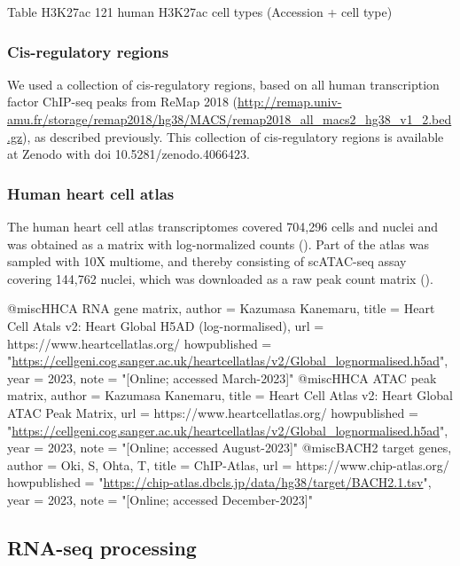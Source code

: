 Table H3K27ac
121 human H3K27ac cell types (Accession + cell type)

\subsubsection{Cis-regulatory regions}

We used a collection of cis-regulatory regions, based on all human transcription factor ChIP-seq peaks from ReMap 2018\cite{Chneby2017} (\url{http://remap.univ-amu.fr/storage/remap2018/hg38/MACS/remap2018_all_macs2_hg38_v1_2.bed.gz}), as described previously\cite{Xu_2020}. This collection of cis-regulatory regions is available at Zenodo with doi 10.5281/zenodo.4066423.

\subsubsection{Human heart cell atlas}

The human heart cell atlas transcriptomes covered 704,296 cells and nuclei and was obtained as a matrix with log-normalized counts (\cite{HHCA RNA gene matrix}). Part of the atlas was sampled with 10X multiome, and thereby consisting of scATAC-seq assay covering 144,762 nuclei, which was downloaded as a raw peak count matrix (\cite{HHCA ATAC peak matrix}).

@misc{HHCA RNA gene matrix,
  author = {Kazumasa Kanemaru},
  title = {{Heart Cell Atals v2: Heart Global H5AD (log-normalised)}},
  url = {https://www.heartcellatlas.org/}
  howpublished = "\url{https://cellgeni.cog.sanger.ac.uk/heartcellatlas/v2/Global_lognormalised.h5ad}",
  year = {2023}, 
  note = "[Online; accessed March-2023]"
}
@misc{HHCA ATAC peak matrix,
  author = {Kazumasa Kanemaru},
  title = {{Heart Cell Atlas v2: Heart Global ATAC Peak Matrix}},
  url = {https://www.heartcellatlas.org/}
  howpublished = "\url{https://cellgeni.cog.sanger.ac.uk/heartcellatlas/v2/Global_lognormalised.h5ad}",
  year = {2023}, 
  note = "[Online; accessed August-2023]"
}
@misc{BACH2 target genes,
  author = {Oki, S, Ohta, T},
  title = {{ChIP-Atlas}},
  url = {https://www.chip-atlas.org/}
  howpublished = "\url{https://chip-atlas.dbcls.jp/data/hg38/target/BACH2.1.tsv}",
  year = {2023}, 
  note = "[Online; accessed December-2023]"
}

\subsection{RNA-seq processing}

